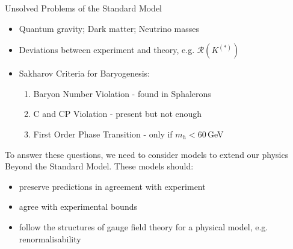 \documentclass[10pt,xcolor={table,dvipsnames},t]{beamer}
\begin{document}
\begin{frame}{Unsolved Problems of the Standard Model}
    \begin{itemize}
        \item Quantum gravity; Dark matter; Neutrino masses
        \item Deviations between experiment and theory, e.g. $\mathcal{R}(K^{(*)})$
        \item Sakharov Criteria for Baryogenesis:
            \begin{enumerate}
                \item Baryon Number Violation - found in Sphalerons
                \item C and CP Violation - present but not enough
                \item First Order Phase Transition - only if $m_h<60\,$GeV 
            \end{enumerate}
    \end{itemize}
    To answer these questions, we need to consider models to extend our physics Beyond the Standard Model. 
    These models should:
    \begin{itemize}
        \item preserve predictions in agreement with experiment
        \item agree with experimental bounds
        \item follow the structures of gauge field theory for a physical model, e.g. renormalisability
    \end{itemize}
\end{frame}
\end{document}
